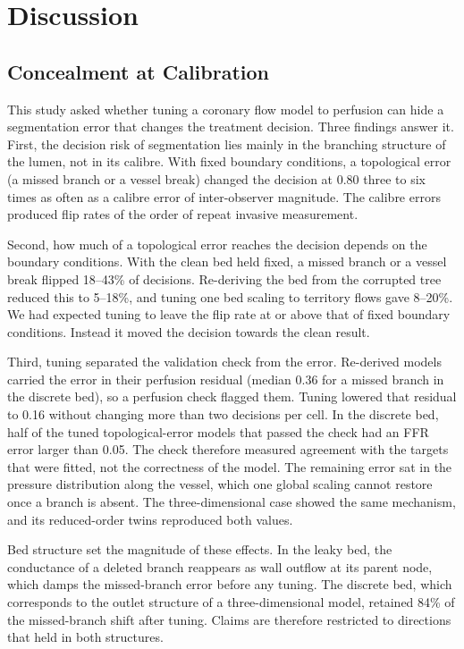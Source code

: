 \documentclass[journal]{IEEEtran}
\begin{document}
\section{Discussion}
\subsection{Concealment at Calibration}
This study asked whether tuning a coronary flow model to perfusion can hide a segmentation error that changes the
treatment decision. Three findings answer it. First, the decision risk of segmentation lies mainly in the branching structure of the lumen, not in its calibre.
With fixed boundary conditions, a topological error (a missed branch or a vessel break) changed the decision at
0.80 three to six times as often as a calibre error of inter-observer magnitude. The calibre errors produced flip
rates of the order of repeat invasive measurement.

Second, how much of a topological error reaches the decision depends on the boundary conditions. With the clean bed
held fixed, a missed branch or a vessel break flipped 18--43\% of decisions. Re-deriving the bed from the corrupted
tree reduced this to 5--18\%, and tuning one bed scaling to territory flows gave 8--20\%. We had expected tuning to
leave the flip rate at or above that of fixed boundary conditions. Instead it moved the decision towards the clean
result.

Third, tuning separated the validation check from the error. Re-derived models carried the error in their perfusion
residual (median 0.36 for a missed branch in the discrete bed), so a perfusion check flagged them. Tuning lowered
that residual to 0.16 without changing more than two decisions per cell. In the discrete bed, half of the tuned
topological-error models that passed the check had an FFR error larger than 0.05. The check therefore measured
agreement with the targets that were fitted, not the correctness of the model. The remaining error sat in the
pressure distribution along the vessel, which one global scaling cannot restore once a branch is absent. The
three-dimensional case showed the same mechanism, and its reduced-order twins reproduced both values.

Bed structure set the magnitude of these effects. In the leaky bed, the conductance of a deleted branch reappears
as wall outflow at its parent node, which damps the missed-branch error before any tuning. The discrete bed, which
corresponds to the outlet structure of a three-dimensional model, retained 84\% of the missed-branch shift after
tuning. Claims are therefore restricted to directions that held in both structures.
\end{document}
